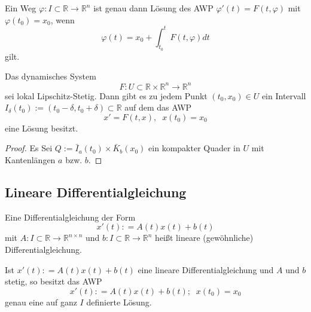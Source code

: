 \begin{Satz}
Ein Weg $\varphi : I \subset \mathbb{R} \to \mathbb{R}^n$ ist genau dann Lösung des AWP $\varphi'(t) = F(t , \varphi)$ mit $ \varphi(t_0)= x_0$, wenn
$$ \varphi(t) =  x_0 + \int_{t_0}^{t} F(t, \varphi) dt$$
gilt.
\end{Satz}



\begin{Satz}
\end{Satz}


\begin{Satz}
Das dynamisches System  $$F : U \subset \mathbb{R} \times \mathbb{R}^n \to \mathbb{R}^n$$ sei lokal Lipschitz-Stetig. 
Dann gibt es zu jedem Punkt $(t_0, x_0) \in U$ ein Intervall $I_\delta (t_0) := (t_0 - \delta, t_0 + \delta) \subset \mathbb{R}$ auf dem das AWP 
$$ x' = F(t,x), \; \; x(t_0) = x_0$$
eine Lösung besitzt.
\end{Satz}
\begin{proof}
Es Sei $Q := \bar{I}_a(t_0) \times \bar{K}_b(x_0)$ ein kompakter Quader in $U$ mit Kantenlängen $a$ bzw. $b$.
\end{proof}


\begin{Lemma}[Gronwall]
\end{Lemma}


\begin{Satz}[Eindeutigkeitssatz]
\end{Satz}


\subsection{Lineare Differentialgleichung}

\begin{Definition}
Eine Differentialgleichung der Form
$$ x' (t): = A(t) x(t) + b(t)$$
mit $A: I \subset \mathbb{R} \to \mathbb{R}^{n \times n}$ und $b: I \subset \mathbb{R} \to \mathbb{R}^{n}$ heißt lineare (gewöhnliche) Differentialgleichung.
\end{Definition}

\begin{Satz}
Ist $ x' (t): = A(t) x(t) + b(t)$ eine lineare Differentialgleichung und $A$ und $b$ stetig, so besitzt das AWP 
$$ x' (t): = A(t) x(t) + b(t) ; \; \; x(t_0) = x_0 $$
genau eine auf ganz $I$ definierte Lösung.
\end{Satz}

